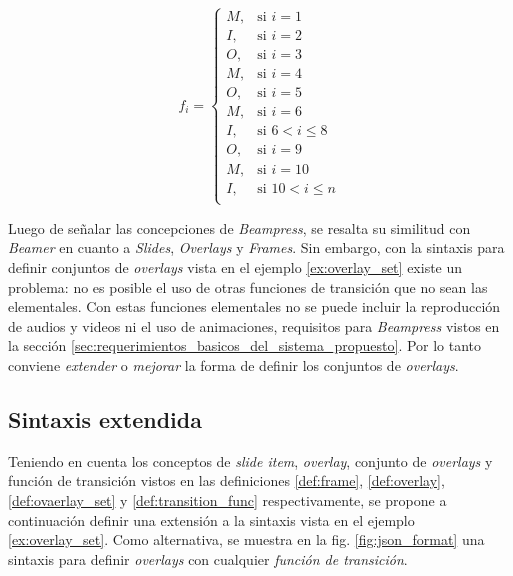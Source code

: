 		\begin{equation}
		\label{eq:example}
			f_i = 
			\begin{cases}
				M, & \mbox{si }i = 1 \\
				I, & \mbox{si }i = 2  \\
				O, & \mbox{si }i = 3  \\
				M, & \mbox{si }i = 4  \\
				O, & \mbox{si }i = 5  \\
				M, & \mbox{si }i = 6  \\
				I, & \mbox{si } 6 < i \leq 8  \\
				O, & \mbox{si }i = 9  \\
				M, & \mbox{si }i = 10  \\
				I, & \mbox{si } 10 < i \leq n  \\
			\end{cases}
		\end{equation}




	Luego de señalar las concepciones de \textit{Beampress}, se resalta su similitud con \textit{Beamer} en cuanto a \textit{Slides}, \textit{Overlays} y \textit{Frames}. Sin embargo, con la sintaxis para definir conjuntos de \textit{overlays} vista en el ejemplo \ref{ex:overlay_set} existe un problema: no es posible el uso de otras funciones de transición que no sean las elementales. Con estas funciones elementales no se puede incluir la reproducción de audios y videos ni el uso de animaciones, requisitos para \textit{Beampress} vistos en la sección \ref{sec:requerimientos_basicos_del_sistema_propuesto}. Por lo tanto conviene \textit{extender} o \textit{mejorar} la forma de definir los conjuntos de \textit{overlays}.



	\subsection{Sintaxis extendida} %
	\label{subsec:sintaxis_extendida}
	

	Teniendo en cuenta los conceptos de \textit{slide item}, \textit{overlay}, conjunto de \textit{overlays} y función de transición vistos en las definiciones \ref{def:frame}, \ref{def:overlay}, \ref{def:ovaerlay_set} y \ref{def:transition_func} respectivamente, se propone a continuación definir una extensión a la sintaxis vista en el ejemplo \ref{ex:overlay_set}. Como alternativa, se muestra en la fig. \ref{fig:json_format} una sintaxis para definir \textit{overlays} con cualquier \textit{función de transición}.

